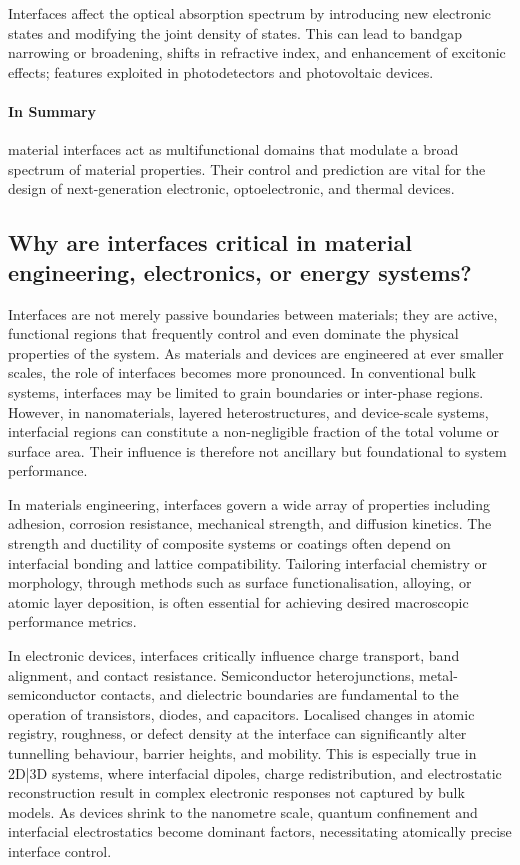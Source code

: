 Interfaces affect the optical absorption spectrum by introducing new electronic states and modifying the joint density of states. This can lead to bandgap narrowing or broadening, shifts in refractive index, and enhancement of excitonic effects; features exploited in photodetectors and photovoltaic devices.

\paragraph{In Summary} material interfaces act as multifunctional domains that modulate a broad spectrum of material properties. Their control and prediction are vital for the design of next-generation electronic, optoelectronic, and thermal devices.

\subsection{Why are interfaces critical in material engineering, electronics, or energy systems?}

Interfaces are not merely passive boundaries between materials; they are active, functional regions that frequently control and even dominate the physical properties of the system. As materials and devices are engineered at ever smaller scales, the role of interfaces becomes more pronounced. In conventional bulk systems, interfaces may be limited to grain boundaries or inter-phase regions. However, in nanomaterials, layered heterostructures, and device-scale systems, interfacial regions can constitute a non-negligible fraction of the total volume or surface area. Their influence is therefore not ancillary but foundational to system performance.

In materials engineering, interfaces govern a wide array of properties including adhesion, corrosion resistance, mechanical strength, and diffusion kinetics. The strength and ductility of composite systems or coatings often depend on interfacial bonding and lattice compatibility. Tailoring interfacial chemistry or morphology, through methods such as surface functionalisation, alloying, or atomic layer deposition, is often essential for achieving desired macroscopic performance metrics.

In electronic devices, interfaces critically influence charge transport, band alignment, and contact resistance. Semiconductor heterojunctions, metal-semiconductor contacts, and dielectric boundaries are fundamental to the operation of transistors, diodes, and capacitors. Localised changes in atomic registry, roughness, or defect density at the interface can significantly alter tunnelling behaviour, barrier heights, and mobility. This is especially true in 2D|3D systems, where interfacial dipoles, charge redistribution, and electrostatic reconstruction result in complex electronic responses not captured by bulk models. As devices shrink to the nanometre scale, quantum confinement and interfacial electrostatics become dominant factors, necessitating atomically precise interface control.

